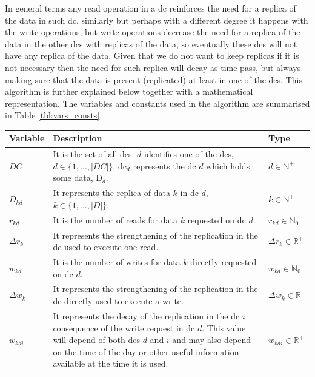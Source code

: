 \documentclass[english]{article}
\begin{document}
In general terms any read operation in a \gls{dc} reinforces the need for a replica of the data in such \gls{dc}, similarly but perhaps with a different degree it happens with the write operations, but write operations decrease the need for a replica of the data in the other \glspl{dc} with replicas of the data, so eventually these \glspl{dc} will not have any replica of the data. Given that we do not want to keep replicas if it is not necessary then the need for such replica will decay as time pass, but always making sure that the data is present (replicated) at least in one of the \glspl{dc}. This algorithm is further explained below together with a mathematical representation. The variables and constants used in the algorithm are summarised in Table \ref{tbl:vars_consts}.
\begin{table}[ht!]
	\begin{tabular}{ |l|p{7.8cm}|l|}
		\hline
		{\bf Variable}    & {\bf Description} & {\bf Type} \\
		\hline
		\hline
		$DC$                & It is the set of all \glspl{dc}. $d$ identifies one of the \glspl{dc}, $d \in \{1,\dots, |DC|\}$. \gls{dc}$_{d}$ represents the \gls{dc} $d$ which holds some data, D$_{d}$. &  $d \in \mathbb{N}^{+}$ \\
		\hline
		$D_{kd}$           & It represents the replica of data $k$ in \gls{dc} $d$, $k \in \{1,\dots, |D|\}$. & $k \in \mathbb{N}^{+}$ \\
		\hline
		$r_{kd}$            & It is the number of reads for data $k$ requested on \gls{dc} $d$. & $r_{kd} \in \mathbb{N}_{0}$ \\
		\hline
		$\Delta r_{k}$   & It represents the strengthening of the replication in the \gls{dc} used to execute one read. & $\Delta r_{k} \in \mathbb{R}^{+}$ \\
		\hline
		$w_{kd}$           & It is the number of writes for data $k$ directly requested on \gls{dc} $d$. & $w_{kd}\in \mathbb{N}_{0}$ \\
		\hline
		$\Delta w_{k}$  & It represents the strengthening of the replication in the \gls{dc} directly used to execute a write. & $\Delta w_{k} \in \mathbb{R}^{+}$ \\
		\hline
		$w_{kdi}$          & It represents the decay of the replication in the \gls{dc} $i$ consequence of the write request in \gls{dc} $d$. This value will depend of both \glspl{dc} $d$ and $i$ and may also depend on the time of the day or other useful information available at the time it is used. & $w_{kdi} \in \mathbb{R}^{+}$ \\

\end{tabular}
\end{table}
\end{document}
